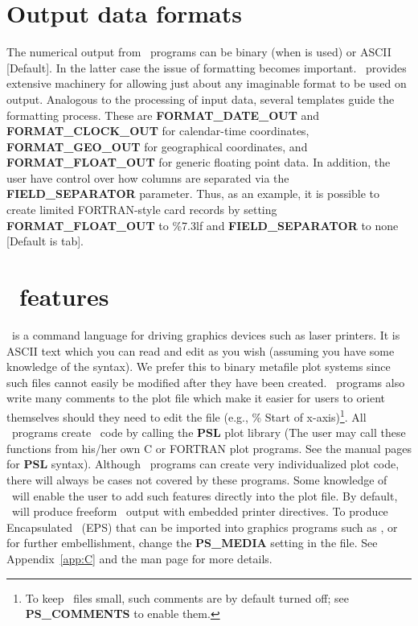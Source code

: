 \section{Output data formats}
\label{sec:output data}

The numerical output from \GMT\ programs can be binary (when  is used) or ASCII [Default].
In the latter case the issue of formatting becomes important.  \GMT\ provides extensive
machinery for allowing just about any imaginable format to be used on output.  Analogous to
the processing of input data, several templates guide the formatting process.  These are
\textbf{FORMAT\_DATE\_OUT} and \textbf{FORMAT\_CLOCK\_OUT} for calendar-time coordinates,
\textbf{FORMAT\_GEO\_OUT} for geographical coordinates, and \textbf{FORMAT\_FLOAT\_OUT} for generic
floating point data.  In addition, the user have control over how columns are separated via
the \textbf{FIELD\_SEPARATOR} parameter.  Thus, as an example, it is possible to create limited
FORTRAN-style card records by setting \textbf{FORMAT\_FLOAT\_OUT} to \%7.3lf and \textbf{FIELD\_SEPARATOR} to
none [Default is tab].

\section{\PS\ features}
\PS\ is a command language for driving graphics
devices such as laser printers.  It is ASCII text which you
can read and edit as you wish (assuming you have some knowledge
of the syntax).  We prefer this to binary metafile plot
systems since such files cannot easily be modified after they
have been created.  \GMT\ programs also write many comments to
the plot file which make it easier for users to orient
themselves should they need to edit the file (e.g., \% Start
of x-axis)\footnote{To keep \PS\ files small, such comments are by default
turned off; see \textbf{PS\_COMMENTS} to enable them.}.  All \GMT\ programs create \PS\ code by
calling the \textbf{PSL} plot library (The user may call these
functions from his/her own C or FORTRAN plot programs. See the
manual pages for \textbf{PSL} syntax).  Although \GMT\ programs
can create very individualized plot code, there will always be
cases not covered by these programs.  Some knowledge of
\PS\ will enable the user to add such features
directly into the plot file.  By default, \GMT\ will produce
freeform \PS\ output with embedded printer directives.  To
produce Encapsulated \PS\ (EPS) that can be imported into graphics programs such as
,  or  for further
embellishment, change the \textbf{PS\_MEDIA} setting in the 
file.  See Appendix~\ref{app:C} and the  man page for more details.

